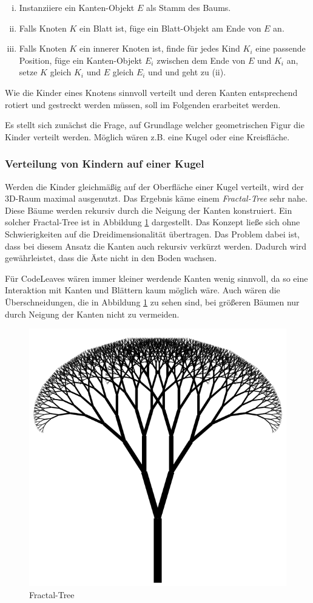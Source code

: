\begin{enumerate}[(i), labelindent=0pt, align=left, itemsep=0pt, parsep=0pt, labelsep=.5em, leftmargin=!]
  \item Instanziiere ein Kanten-Objekt $E$ als Stamm des Baums.
  \item Falls Knoten $K$ ein Blatt ist, füge ein Blatt-Objekt am Ende von $E$ an.
  \item Falls Knoten $K$ ein innerer Knoten ist, finde für jedes Kind $K_i$ eine passende Position, füge ein Kanten-Objekt $E_i$ zwischen dem Ende von $E$ und $K_i$ an, setze $K$ gleich $K_i$ und $E$ gleich $E_i$ und und geht zu (ii).
\end{enumerate}

Wie die Kinder eines Knotens sinnvoll verteilt und deren Kanten entsprechend rotiert und gestreckt werden müssen, soll im Folgenden erarbeitet werden.

Es stellt sich zunächst die Frage, auf Grundlage welcher geometrischen Figur die Kinder verteilt werden. Möglich wären z.B. eine Kugel oder eine Kreisfläche.

\subsubsection*{Verteilung von Kindern auf einer Kugel}
Werden die Kinder gleichmäßig auf der Oberfläche einer Kugel verteilt, wird der 3D-Raum maximal ausgenutzt. Das Ergebnis käme einem \textit{Fractal-Tree} sehr nahe. Diese Bäume werden rekursiv durch die Neigung der Kanten konstruiert. Ein solcher Fractal-Tree ist in Abbildung \ref{fig:fractal-tree} dargestellt. Das Konzept ließe sich ohne Schwierigkeiten auf die Dreidimensionalität übertragen. Das Problem dabei ist, dass bei diesem Ansatz die Kanten auch rekursiv verkürzt werden. Dadurch wird gewährleistet, dass die Äste nicht in den Boden wachsen.

Für CodeLeaves wären immer kleiner werdende Kanten wenig sinnvoll, da so eine Interaktion mit Kanten und Blättern kaum möglich wäre. Auch wären die Überschneidungen, die in Abbildung \ref{fig:fractal-tree} zu sehen sind, bei größeren Bäumen nur durch Neigung der Kanten nicht zu vermeiden.

\begin{figure}[htb]
  \includegraphics[width=.5\textwidth]{figures/fractal-tree}
  \caption{Fractal-Tree \cite{rocchini2017fractal}}
  \label{fig:fractal-tree}
\end{figure}

